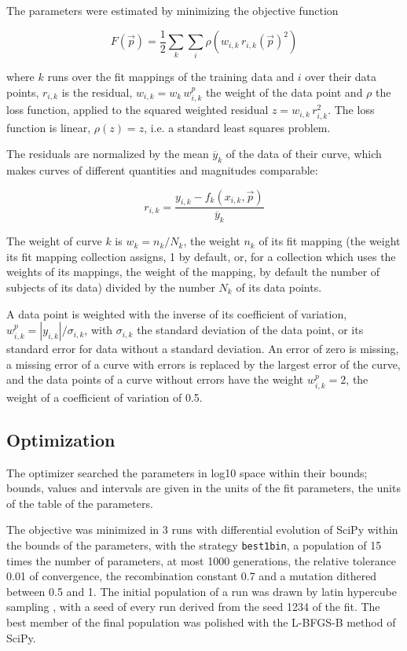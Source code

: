 \documentclass{article}
\begin{document}
The parameters were estimated by minimizing the objective function

\begin{equation}
F(\vec{p}) = \frac{1}{2} \sum_{k} \sum_{i} \rho\left(w_{i,k}\, r_{i,k}(\vec{p})^2\right)
\end{equation}

where $k$ runs over the fit mappings of the training data and $i$ over their data points, $r_{i,k}$ is the residual, $w_{i,k} = w_k\, w^{p}_{i,k}$ the weight of the data point and $\rho$ the loss function, applied to the squared weighted residual $z = w_{i,k}\, r_{i,k}^2$. The loss function is linear, $\rho(z) = z$, i.e. a standard least squares problem.

The residuals are normalized by the mean $\overline{y}_k$ of the data of their curve, which makes curves of different quantities and magnitudes comparable:

\begin{equation}
r_{i,k} = \frac{y_{i,k} - f_k(x_{i,k}, \vec{p})}{\overline{y}_k}
\end{equation}

The weight of curve $k$ is $w_k = n_k / N_k$, the weight $n_k$ of its fit mapping (the weight its fit mapping collection assigns, 1 by default, or, for a collection which uses the weights of its mappings, the weight of the mapping, by default the number of subjects of its data) divided by the number $N_k$ of its data points.

A data point is weighted with the inverse of its coefficient of variation, $w^{p}_{i,k} = |y_{i,k}| / \sigma_{i,k}$, with $\sigma_{i,k}$ the standard deviation of the data point, or its standard error for data without a standard deviation. An error of zero is missing, a missing error of a curve with errors is replaced by the largest error of the curve, and the data points of a curve without errors have the weight $w^{p}_{i,k} = 2$, the weight of a coefficient of variation of 0.5.

\subsection{Optimization}

The optimizer searched the parameters in log10 space within their bounds; bounds, values and intervals are given in the units of the fit parameters, the units of the table of the parameters.

The objective was minimized in 3 runs with differential evolution \cite{Storn1997} of SciPy \cite{Virtanen2020} within the bounds of the parameters, with the strategy \texttt{best1bin}, a population of 15 times the number of parameters, at most 1000 generations, the relative tolerance 0.01 of convergence, the recombination constant 0.7 and a mutation dithered between 0.5 and 1. The initial population of a run was drawn by latin hypercube sampling \cite{McKay1979}, with a seed of every run derived from the seed 1234 of the fit. The best member of the final population was polished with the L-BFGS-B method of SciPy.
\end{document}
